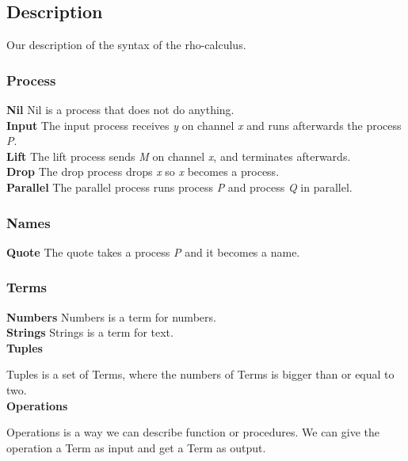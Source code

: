 \subsection{Description}
Our description of the syntax of the rho-calculus.

\subsubsection{Process}
\textbf{Nil}
Nil is a process that does not do anything.
\\
\textbf{Input}
The input process receives \textit{y} on channel \textit{x} and runs afterwards the process \textit{P}.
\\
\textbf{Lift}
The lift process sends \textit{M} on channel \textit{x}, and terminates afterwards.
\\
\textbf{Drop}
The drop process drops \textit{x} so \textit{x} becomes a process.
\\
\textbf{Parallel}
The parallel process runs process \textit{P} and process \textit{Q} in parallel.

\subsubsection{Names}
\textbf{Quote}
The quote takes a process \textit{P} and it becomes a name.

\subsubsection{Terms}
\textbf{Numbers} 
Numbers is a term for numbers.
\\
\textbf{Strings}
Strings is a term for text.
\\
\textbf{Tuples}

Tuples is a set of Terms, where the numbers of Terms is bigger than or equal to two.
\\
\textbf{Operations}

Operations is a way we can describe function or procedures. We can give the operation a Term as input and get a Term as output.